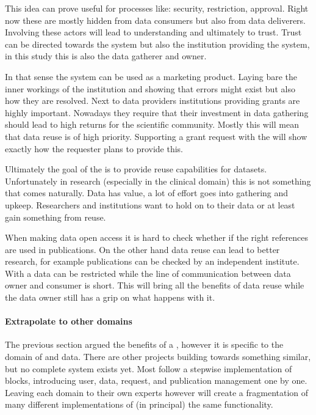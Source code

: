 This idea can prove useful for processes like: security, restriction, approval.
Right now these are mostly hidden from data consumers but also from data deliverers.
Involving these actors will lead to understanding and ultimately to trust.
Trust can be directed towards the system but also the institution providing the system, in this study this is also the data gatherer and owner.

In that sense the system can be used as a marketing product.
Laying bare the inner workings of the institution and showing that errors might exist but also how they are resolved.
Next to data providers institutions providing grants are highly important.
Nowadays they require that their investment in data gathering should lead to high returns for the scientific community.
Mostly this will mean that data reuse is of high priority. 
Supporting a grant request with the \ivfsystem{} will show exactly how the requester plans to provide this.

Ultimately the goal of the \ivfsystem{} is to provide reuse capabilities for datasets.
Unfortunately in research (especially in the clinical domain) this is not something that comes naturally.
Data has value, a lot of effort goes into gathering and upkeep.
Researchers and institutions want to hold on to their data or at least gain something from reuse.

When making data open access it is hard to check whether if the right references are used in publications.
On the other hand data reuse can lead to better research, for example publications can be checked by an independent institute.
With a \ivfsystem{} data can be restricted while the line of communication between data owner and consumer is short.
This will bring all the benefits of data reuse while the data owner still has a grip on what happens with it.

\paragraph{Extrapolate to other domains}

The previous section argued the benefits of a \ivfsystem{}, however it is specific to the domain of \IVF{} and \PRN{} data.
There are other projects building towards something similar, but no complete system exists yet.
Most follow a stepwise implementation of blocks, introducing user, data, request, and publication management one by one.
Leaving each domain to their own experts however will create a fragmentation of many different implementations of (in principal) the same functionality.

